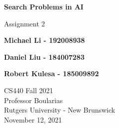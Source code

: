 \documentclass[11pt]{article}
\begin{document}
    \begin{titlepage}
        \begin{center}
            \vspace{1cm}

            \Huge
            \textbf{Search Problems in AI}

            \vspace{0.5cm}
            \LARGE
            Assignment 2

            \vspace{1cm}

            \textbf{Michael Li - 192008938}

            \textbf{Daniel Liu - 184007283}

            \textbf{Robert Kulesa - 185009892}


            \vfill


            \vspace{0.8cm}

            \Large
            CS440 Fall 2021\\
            Professor Boularias\\
            Rutgers University - New Brunswick\\
            November 12, 2021

        \end{center}
    \end{titlepage}
\end{document}
